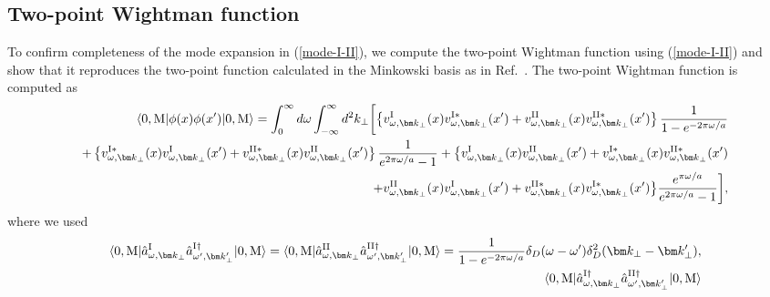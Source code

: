 \documentclass[aps,prd,preprintnumbers,nofootinbib,showpacs]{revtex4}%
\begin{document}
\begin{widetext}
\subsection{Two-point Wightman function \label{Sec:2pointWightman} }
To confirm completeness of the mode expansion in (\ref{mode-I-II}), 
we compute the two-point Wightman function using (\ref{mode-I-II}) and show that it reproduces
the two-point function calculated in the Minkowski basis as in Ref.~\cite{Higuchi}.
The two-point Wightman function is computed as
\begin{eqnarray}
&&\langle0,{\rm M}|\phi(x)\phi(x')|0,{\rm M}\rangle=\int_0^\infty d\omega\int_{-\infty}^{\infty} 
d^2 k_\perp \biggl[\left\{
v_{\omega,{\bm k}_\perp}^{\rm I}(x)v_{\omega,{\bm k}_\perp}^{\rm I*}(x')
+v_{\omega,{\bm k}_\perp}^{\rm II}(x)v_{\omega,{\bm k}_\perp}^{\rm II*}(x')
\right\}{1\over 1-e^{-2\pi\omega/a}}
\nonumber\\
&&+\left\{
v_{\omega,{\bm k}_\perp}^{\rm I*}(x)v_{\omega,{\bm k}_\perp}^{\rm I}(x')
+v_{\omega,{\bm k}_\perp}^{\rm II*}(x)v_{\omega,{\bm k}_\perp}^{\rm II}(x')
\right\}{1\over e^{2\pi\omega/a}-1}
+\bigl\{
v_{\omega,{\bm k}_\perp}^{\rm I}(x)v_{\omega,{\bm k}_\perp}^{\rm II}(x')
+v_{\omega,{\bm k}_\perp}^{\rm I*}(x)v_{\omega,{\bm k}_\perp}^{\rm II*}(x')
\nonumber\\
&&+
v_{\omega,{\bm k}_\perp}^{\rm II}(x)v_{\omega,{\bm k}_\perp}^{\rm I}(x')
+v_{\omega,{\bm k}_\perp}^{\rm II*}(x)v_{\omega,{\bm k}_\perp}^{\rm I*}(x')
\bigr\}{e^{\pi\omega/a}\over e^{2\pi\omega/a}-1}\biggr],
\end{eqnarray}
where we used
\begin{eqnarray}
&& \langle0,{\rm M}|\hat a_{\omega,{\bm k}_\perp}^{\rm I}\hat a_{\omega',{\bm k}_\perp'}^{\rm I \dagger}|0,{\rm M}\rangle
=\langle0,{\rm M}|\hat a_{\omega,{\bm k}_\perp}^{\rm II}\hat a_{\omega',{\bm k}_\perp'}^{\rm II \dagger}|0,{\rm M}\rangle
={1\over 1- e^{-2\pi\omega/a} }\delta_D(\omega-\omega')\delta_D^2(\bm k_\perp-\bm k_\perp'),
\nonumber
\\
&&\langle0,{\rm M}|\hat a_{\omega,{\bm k}_\perp}^{\rm I \dagger}\hat a_{\omega',{\bm k}_\perp'}^{\rm II \dagger}|0,{\rm M}\rangle

\end{eqnarray}
\end{widetext}
\end{document}
